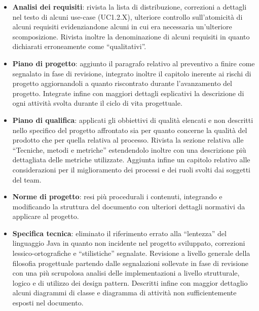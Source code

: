 \begin{itemize}
\item \textbf{Analisi dei requisiti}: rivista la lista di distribuzione, correzioni a dettagli nel testo di alcuni use-case (UC1.2.X), ulteriore controllo sull'atomicità di alcuni requisiti evidenziandone alcuni in cui era necessaria un'ulteriore scomposizione. Rivista inoltre la denominazione di alcuni requisiti in quanto dichiarati erroneamente come ``qualitativi''.

\item \textbf{Piano di progetto}: aggiunto il paragrafo relativo al preventivo a finire come segnalato in fase di revisione, integrato inoltre il capitolo inerente ai rischi di progetto aggiornandoli a quanto riscontrato durante l'avanzamento del progetto. Integrate infine con maggiori dettagli esplicativi la descrizione di ogni attività svolta durante il ciclo di vita progettuale.

\item \textbf{Piano di qualifica}: applicati gli obbiettivi di qualità elencati e non descritti nello specifico del progetto affrontato sia per quanto concerne la qualità del prodotto che per quella relativa al processo. Rivista la sezione relativa alle ``Tecniche, metodi e metriche'' estendendolo inoltre con una descrizione più dettagliata delle metriche utilizzate. Aggiunta infine un capitolo relativo alle considerazioni per il miglioramento dei processi e dei ruoli svolti dai soggetti del team.

\item \textbf{Norme di progetto}: resi più procedurali i contenuti, integrando e modificando la struttura del documento con ulteriori dettagli normativi da applicare al progetto.

\item \textbf{Specifica tecnica}: eliminato il riferimento errato alla ``lentezza'' del linguaggio Java in quanto non incidente nel progetto sviluppato, correzioni lessico-ortografiche e ``stilistiche'' segnalate. Revisione a livello generale della filosofia progettuale partendo dalle segnalazioni sollevate in fase di revisione con una più scrupolosa analisi delle implementazioni a livello strutturale, logico e di utilizzo dei design pattern. Descritti infine con maggior dettaglio alcuni diagrammi di classe e diagramma di attività non sufficientemente esposti nel documento.
\end{itemize}



\clearpage

